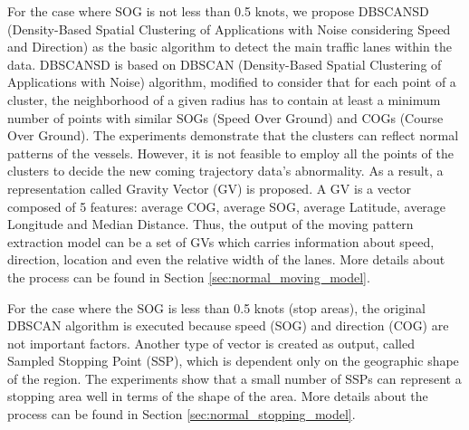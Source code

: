 \documentclass[12pt,glossary]{dalcsthesis}
\begin{document}
For the case where SOG is not less than 0.5 knots, we propose DBSCANSD (Density-Based Spatial Clustering of Applications with Noise considering Speed and Direction) as the basic algorithm to detect the main traffic lanes within the data. DBSCANSD is based on DBSCAN (Density-Based Spatial Clustering of Applications with Noise) \cite{DBScan96} algorithm, modified to consider that for each point of a cluster, the neighborhood of a given radius has to contain at least a minimum number of points with similar SOGs (Speed Over Ground) and COGs (Course Over Ground). The experiments demonstrate that the clusters can reflect normal patterns of the vessels. However, it is not feasible to employ all the points of the clusters to decide the new coming trajectory data's abnormality. As a result, a representation called Gravity Vector (GV) is proposed. A GV is a vector composed of 5 features: average COG, average SOG, average Latitude, average Longitude and Median Distance. Thus, the output of the moving pattern extraction model can be a set of GVs which carries information about speed, direction, location and even the relative width of the lanes.
More details about the process can be found in Section \ref{sec:normal_moving_model}.

For the case where the SOG is less than 0.5 knots (stop areas), the original DBSCAN algorithm \cite{DBScan96} is executed because speed (SOG) and direction (COG) are not important factors. Another type of vector is created as output, called Sampled Stopping Point (SSP), which is dependent only on the geographic shape of the region. The experiments show that a small number of SSPs can represent a stopping area well in terms of the shape of the area. More details about the process can be found in Section \ref{sec:normal_stopping_model}.
\end{document}
